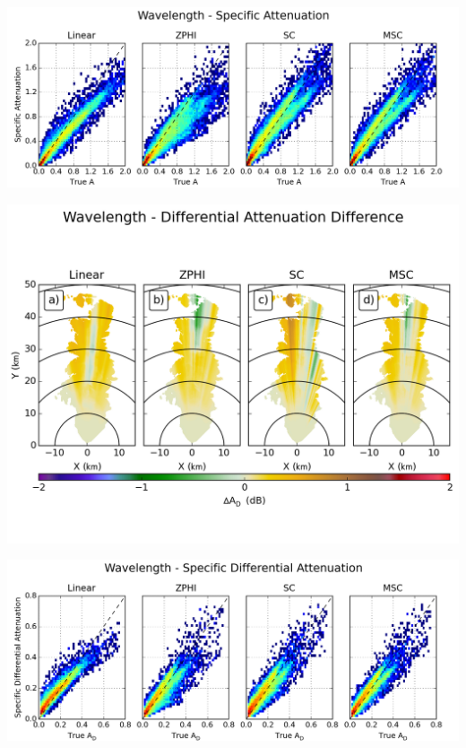 \documentclass[red]{beamer}
\begin{document}
\begin{frame}
	\begin{center}
		\includegraphics[scale=0.45]{figures/C_Wavelength_Specific_Attenuation_scatter.png}
	\end{center}
\end{frame}

\begin{frame}
	\begin{center}
		\includegraphics[scale=0.45]{figures/C_Wavelength_Differential_Attenuation_Difference.png}
	\end{center}
\end{frame}

\begin{frame}
	\begin{center}
		\includegraphics[scale=0.45]{figures/C_Wavelength_Specific_Differential_Attenuation_scatter.png}
	\end{center}
\end{frame}
\end{document}
